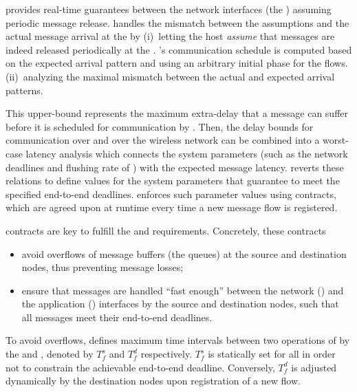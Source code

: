 \blink provides real-time guarantees between the network interfaces (\ie the \CPs) assuming periodic message release. \DRP handles the mismatch between the \blink assumptions and the actual message arrival at the \CPs by
(i)~letting the host \emph{assume} that messages are indeed released periodically at the \CPs.
  \blink's communication schedule is computed based on the expected arrival pattern and using an arbitrary initial phase for the flows.
(ii)~analyzing the maximal mismatch between the actual and expected arrival patterns.

This upper-bound represents the maximum extra-delay that a message can suffer before it is scheduled for communication by \blink.
Then, the delay bounds for communication over \bolt and over the wireless network can be combined into a worst-case latency analysis which connects the system parameters (such as the network deadlines and flushing rate of \bolt) with the expected message latency.
\DRP reverts these relations to define values for the system parameters
that guarantee to meet the specified end-to-end deadlines.
\DRP enforces such parameter values using contracts, which are agreed upon at runtime every time a new message flow is registered.

\DRP contracts are key to fulfill the  and  requirements. Concretely, these contracts
\begin{itemize}[nosep]
  \item avoid overflows of message buffers (\eg the \bolt queues) at the source and destination nodes, thus preventing message losses;
  \item ensure that messages are handled ``fast enough'' between the network (\ie \CPs) and the application (\ie \APs) interfaces by the source and destination nodes, such that all messages meet their end-to-end deadlines.
\end{itemize}

To avoid overflows, \DRP defines {maximum time intervals} between two \opflush operations of \bolt by the \CPs and \APs, denoted by $T_f^s$ and $T_f^d$ respectively.
$T_f^s$ is statically set for all \CPs in order not to constrain the achievable end-to-end deadline.
Conversely, $T_f^d$ is adjusted dynamically by the destination nodes upon registration of a new flow.

